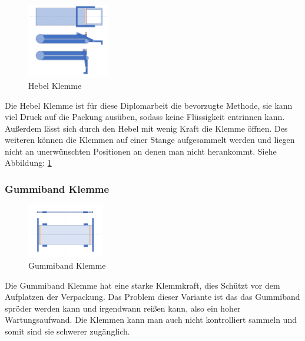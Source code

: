 \begin{figure}
\vspace{-30pt}
  \begin{center}
    \includegraphics[width=0.32\textwidth]{Bilder/Powerpoint/Hebel_Klemme}
  \end{center}
  \caption{Hebel Klemme}
  \label{Hebel Klemme}
  \vspace{-10pt}
\end{figure}

Die Hebel Klemme ist für diese Diplomarbeit die bevorzugte Methode, sie kann viel Druck auf die Packung ausüben, sodass keine Flüssigkeit entrinnen kann. Außerdem lässt sich durch den Hebel mit wenig Kraft die Klemme öffnen. Des weiteren können die Klemmen auf einer Stange aufgesammelt werden und liegen nicht an unerwünschten Positionen an denen man nicht herankommt. Siehe Abbildung: \ref{Hebel Klemme}
 \vspace{40pt}


\subsubsection{Gummiband Klemme}
 
\begin{figure}
\vspace{-40pt}
  \begin{center}
    \includegraphics[width=0.30\textwidth]{Bilder/Powerpoint/Gummiband_Klemme}
  \end{center}
  \caption{Gummiband Klemme}
  \label{Gummiband Klemme}
  \vspace{-10pt}
\end{figure}

Die Gummiband Klemme hat eine starke Klemmkraft, dies Schützt vor dem Aufplatzen der Verpackung. Das Problem dieser Variante ist das das Gummiband spröder werden kann und irgendwann reißen kann, also ein hoher Wartungsaufwand. Die Klemmen kann man auch nicht kontrolliert sammeln und somit sind sie schwerer zugänglich.

